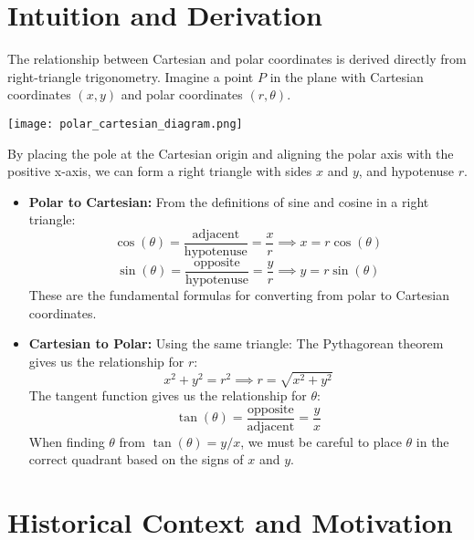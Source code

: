 \documentclass{article}
\begin{document}
\section{Intuition and Derivation}

The relationship between Cartesian and polar coordinates is derived directly from right-triangle trigonometry. Imagine a point \(P\) in the plane with Cartesian coordinates \((x, y)\) and polar coordinates \((r, \theta)\).

\begin{center}
\texttt{[image: polar\_cartesian\_diagram.png]} 
\end{center}

By placing the pole at the Cartesian origin and aligning the polar axis with the positive x-axis, we can form a right triangle with sides \(x\) and \(y\), and hypotenuse \(r\).

\begin{itemize}
    \item \textbf{Polar to Cartesian:} From the definitions of sine and cosine in a right triangle:
    \[ \cos(\theta) = \frac{\text{adjacent}}{\text{hypotenuse}} = \frac{x}{r} \implies x = r \cos(\theta) \]
    \[ \sin(\theta) = \frac{\text{opposite}}{\text{hypotenuse}} = \frac{y}{r} \implies y = r \sin(\theta) \]
    These are the fundamental formulas for converting from polar to Cartesian coordinates.

    \item \textbf{Cartesian to Polar:} Using the same triangle:
    The Pythagorean theorem gives us the relationship for \(r\):
    \[ x^2 + y^2 = r^2 \implies r = \sqrt{x^2 + y^2} \]
    The tangent function gives us the relationship for \(\theta\):
    \[ \tan(\theta) = \frac{\text{opposite}}{\text{adjacent}} = \frac{y}{x} \]
    When finding \(\theta\) from \(\tan(\theta) = y/x\), we must be careful to place \(\theta\) in the correct quadrant based on the signs of \(x\) and \(y\).
\end{itemize}

\section{Historical Context and Motivation}
\end{document}
